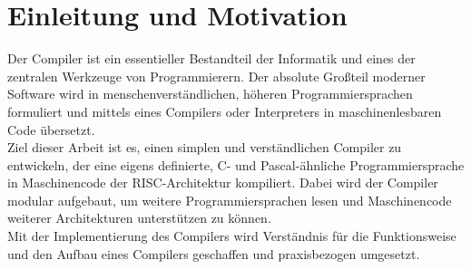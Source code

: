 \chapter{Einleitung und Motivation}
\label{introduction-and-motivation}

Der Compiler ist ein essentieller Bestandteil der Informatik und eines der zentralen Werkzeuge von Programmierern.
Der absolute Großteil moderner Software wird in menschenverständlichen, höheren Programmiersprachen formuliert
und mittels eines Compilers oder Interpreters in maschinenlesbaren Code übersetzt.\\

Ziel dieser Arbeit ist es, einen simplen und verständlichen Compiler zu entwickeln, der eine eigens definierte, C- und Pascal-ähnliche Programmiersprache in Maschinencode der \ac{RISC}-Architektur kompiliert.
Dabei wird der Compiler modular aufgebaut, um weitere Programmiersprachen lesen und Maschinencode weiterer Architekturen unterstützen zu können.\\
Mit der Implementierung des Compilers wird Verständnis für die Funktionsweise und den Aufbau eines Compilers geschaffen und praxisbezogen umgesetzt.
